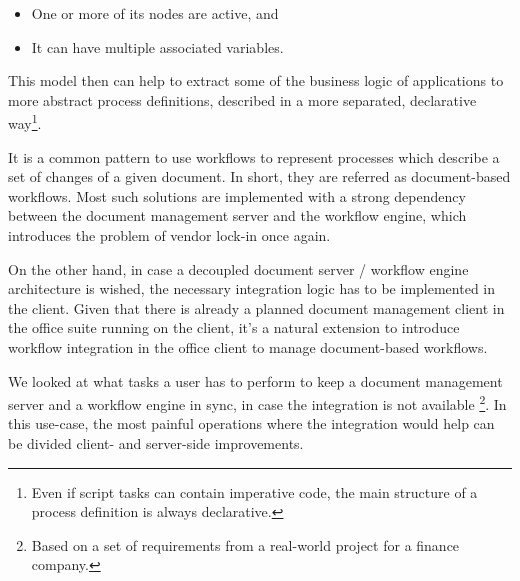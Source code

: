 \begin{itemize}
\item One or more of its nodes are active, and
\item It can have multiple associated variables.
\end{itemize}

This model then can help to extract some of the business logic of applications
to more abstract process definitions, described in a more separated,
declarative way\footnote{Even if script tasks can contain imperative code, the
main structure of a process definition is always declarative.}.

It is a common pattern to use workflows to represent processes which describe a
set of changes of a given document. In short, they are referred as
document-based workflows. Most such solutions are implemented with a strong
dependency between the document management server and the workflow engine,
which introduces the problem of vendor lock-in once again.

On the other hand, in case a decoupled document server / workflow engine
architecture is wished, the necessary integration logic has to be implemented
in the client. Given that there is already a planned document management client
in the office suite running on the client, it's a natural extension to
introduce workflow integration in the office client to manage document-based
workflows.

We looked at what tasks a user has to perform to keep a document management
server and a workflow engine in sync, in case the integration is not available
\footnote{Based on a set of requirements from a real-world project for a
finance company.}.  In this use-case, the most painful operations where the
integration would help can be divided client- and server-side improvements.

